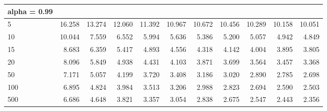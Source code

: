 \documentclass[
  12pt,
]{book}
\theoremstyle{definition}
\theoremstyle{definition}
\theoremstyle{definition}
\theoremstyle{definition}
\theoremstyle{remark}
\begin{document}
\begin{table}
\begin{tabular}[t]{l|r|r|r|r|r|r|r|r|r|r}
\hline
alpha = 0.99 &  &  &  &  &  &  &  &  &  & \\
\hline
5 & 16.258 & 13.274 & 12.060 & 11.392 & 10.967 & 10.672 & 10.456 & 10.289 & 10.158 & 10.051\\
\hline
10 & 10.044 & 7.559 & 6.552 & 5.994 & 5.636 & 5.386 & 5.200 & 5.057 & 4.942 & 4.849\\
\hline
15 & 8.683 & 6.359 & 5.417 & 4.893 & 4.556 & 4.318 & 4.142 & 4.004 & 3.895 & 3.805\\
\hline
20 & 8.096 & 5.849 & 4.938 & 4.431 & 4.103 & 3.871 & 3.699 & 3.564 & 3.457 & 3.368\\
\hline
50 & 7.171 & 5.057 & 4.199 & 3.720 & 3.408 & 3.186 & 3.020 & 2.890 & 2.785 & 2.698\\
\hline
100 & 6.895 & 4.824 & 3.984 & 3.513 & 3.206 & 2.988 & 2.823 & 2.694 & 2.590 & 2.503\\
\hline
500 & 6.686 & 4.648 & 3.821 & 3.357 & 3.054 & 2.838 & 2.675 & 2.547 & 2.443 & 2.356\\
\hline
\end{tabular}
\end{table}

  
\end{document}
